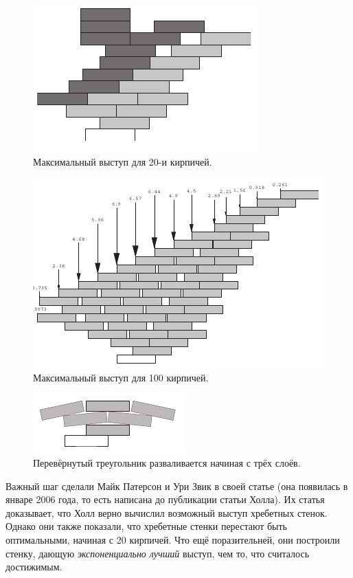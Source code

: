 \begin{figure}[htb!]
\centering
\includegraphics[scale=1]{pics/kirpich3}
\caption{Максимальный выступ для 20-и кирпичей.}
\label{pic:kirpich3}
\end{figure}

\begin{figure}[htb!]
\centering
\includegraphics[scale=1]{pics/kirpich4}
\caption{Максимальный выступ для 100 кирпичей.}
\label{pic:kirpich4}
\end{figure}

\begin{figure}[htb!]
\centering
\includegraphics[scale=1]{pics/kirpich5}
\caption{Перевёрнутый треугольник разваливается начиная с трёх слоёв.}
\label{pic:kirpich5}
\end{figure}

Важный шаг сделали Майк Патерсон и Ури Звик в своей статье \cite{47} (она появилась в январе 2006 года, то есть написана до публикации статьи Холла).
Их статья доказывает, что Холл верно вычислил возможный выступ хребетных стенок.
Однако они также показали, что хребетные стенки перестают быть оптимальными, начиная с 20 кирпичей.
Что ещё поразительней, они построили стенку, дающую \emph{экспоненциально лучший} выступ, чем то, что считалось достижимым.

